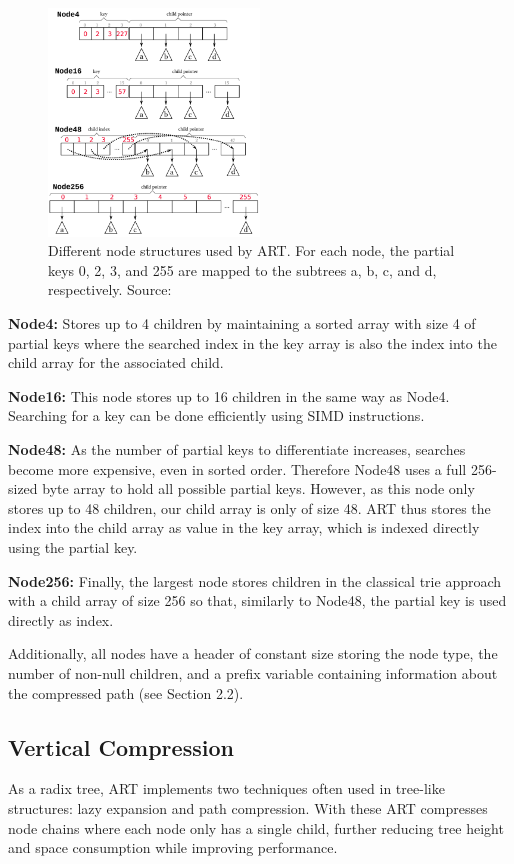 \documentclass[acmtog, nonacm]{acmart}
\begin{document}
\begin{figure}
    \centering
    \includegraphics[width=0.5\textwidth]{images/03-art-node-types.png}
    \caption{Different node structures used by ART. For each node, the partial keys 0, 2, 3, and 255 are mapped to the subtrees a, b, c, and d, respectively.
    Source:~\cite{6544812}}
    \label{fig:nodes}
\end{figure}

\textbf{Node4:} Stores up to 4 children by maintaining a sorted array with size 4 of partial keys where the searched index 
in the key array is also the index into the child array for the associated child.

\textbf{Node16:} This node stores up to 16 children in the same way as Node4. Searching for a key can be done 
efficiently using SIMD instructions.

\textbf{Node48:} As the number of partial keys to differentiate increases, searches become more expensive, even in 
sorted order. Therefore Node48 uses a full 256-sized byte array to hold all possible partial keys. However, as this 
node only stores up to 48 children, our child array is only of size 48. ART thus stores the index into the 
child array as value in the key array, which is indexed directly using the partial key.

\textbf{Node256:} Finally, the largest node stores children in the classical trie approach with a child 
array of size 256 so that, similarly to Node48, the partial key is used directly as index.

Additionally, all nodes have a header of constant size storing the node type, the number of non-null children, 
and a prefix variable containing information about the compressed path (see Section 2.2).

\subsection{Vertical Compression}
As a radix tree, ART implements two techniques often used in tree-like structures: lazy expansion and path compression. 
With these ART compresses node chains where each node only has a single child, further reducing tree height and space 
consumption while improving performance.
\end{document}
